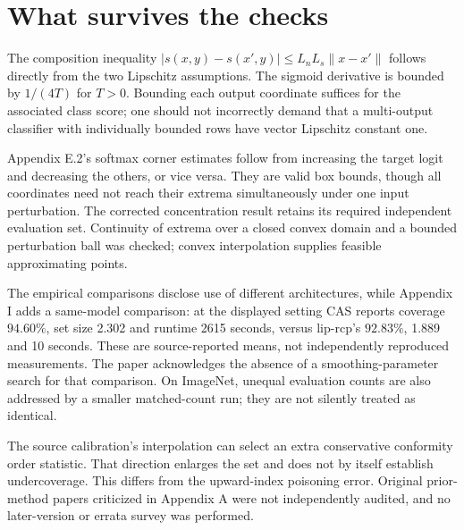 \documentclass[10pt]{article}
\begin{document}
\section*{What survives the checks}
The composition inequality \(|s(x,y)-s(x',y)|\le L_nL_s\|x-x'\|\) follows directly from the two Lipschitz assumptions. The sigmoid derivative is bounded by \(1/(4T)\) for \(T>0\). Bounding each output coordinate suffices for the associated class score; one should not incorrectly demand that a multi-output classifier with individually bounded rows have vector Lipschitz constant one.\par
Appendix E.2’s softmax corner estimates follow from increasing the target logit and decreasing the others, or vice versa. They are valid box bounds, though all coordinates need not reach their extrema simultaneously under one input perturbation. The corrected concentration result retains its required independent evaluation set. Continuity of extrema over a closed convex domain and a bounded perturbation ball was checked; convex interpolation supplies feasible approximating points.\par
The empirical comparisons disclose use of different architectures, while Appendix I adds a same-model comparison: at the displayed setting CAS reports coverage \(94.60\%\), set size 2.302 and runtime 2615 seconds, versus lip-rcp’s \(92.83\%\), 1.889 and 10 seconds. These are source-reported means, not independently reproduced measurements. The paper acknowledges the absence of a smoothing-parameter search for that comparison. On ImageNet, unequal evaluation counts are also addressed by a smaller matched-count run; they are not silently treated as identical.\par
The source calibration’s interpolation can select an extra conservative conformity order statistic. That direction enlarges the set and does not by itself establish undercoverage. This differs from the upward-index poisoning error. Original prior-method papers criticized in Appendix A were not independently audited, and no later-version or errata survey was performed.\par
\end{document}
